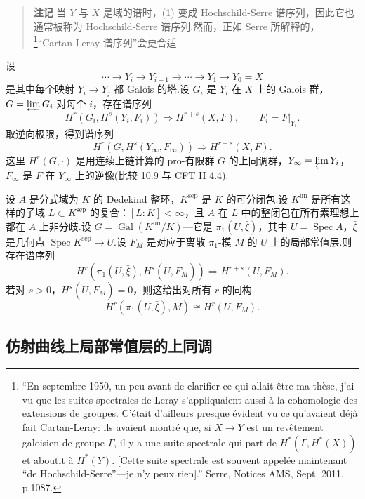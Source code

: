 \begin{quote}
\textbf{注记} 当 $Y$ 与 $X$ 是域的谱时，(1) 变成 Hochschild-Serre 谱序列，因此它也通常被称为 Hochschild-Serre 谱序列.然而，正如 Serre 所解释的，\footnote{``En septembre 1950, un peu avant de clarifier ce qui allait \^etre ma th\`ese, j'ai vu que les suites spectrales de Leray s'appliquaient aussi \`a la cohomologie des extensions de groupes. C'\'etait d'ailleurs presque \'evident vu ce qu'avaient d\'ej\`a fait Cartan-Leray: ils avaient montr\'e que, si $X \to Y$ est un rev\^etement galoisien de groupe $\Gamma$, il y a une suite spectrale qui part de $H^{*}(\Gamma, H^{*}(X))$ et aboutit \`a $H^{*}(Y)$. [Cette suite spectrale est souvent appel\'ee maintenant ``de Hochschild-Serre''---je n'y peux rien].'' Serre, Notices AMS, Sept. 2011, p.1087.}``Cartan-Leray 谱序列''会更合适.
\end{quote}

\begin{remark}\label{rem:14.10}
设
\[
\cdots \to Y_i \to Y_{i-1} \to \cdots \to Y_1 \to Y_0 = X
\]
是其中每个映射 $Y_i \to Y_j$ 都 Galois 的塔.设 $G_i$ 是 $Y_i$ 在 $X$ 上的 Galois 群，$G = \varprojlim G_i$.对每个 $i$，存在谱序列
\[
H^{r}(G_i, H^{s}(Y_i, F_i)) \Rightarrow H^{r+s}(X, F), \qquad F_i = F|_{Y_i}.
\]
取逆向极限，得到谱序列
\[
H^{r}(G, H^{s}(Y_\infty, F_\infty)) \Rightarrow H^{r+s}(X, F).
\]
这里 $H^{r}(G, \cdot)$ 是用连续上链计算的 pro-有限群 $G$ 的上同调群，$Y_\infty = \varprojlim Y_i$，$F_\infty$ 是 $F$ 在 $Y_\infty$ 上的逆像(比较 10.9 与 CFT II 4.4).
\end{remark}

\begin{example}\label{ex:14.11}
设 $A$ 是分式域为 $K$ 的 Dedekind 整环，$K^{\mathrm{sep}}$ 是 $K$ 的可分闭包.设 $K^{\mathrm{un}}$ 是所有这样的子域 $L \subset K^{\mathrm{sep}}$ 的复合：$[L \colon K] < \infty$，且 $A$ 在 $L$ 中的整闭包在所有素理想上都在 $A$ 上非分歧.设 $G = \operatorname{Gal}(K^{\mathrm{un}}/K)$---它是 $\pi_1(U, \bar{\xi})$，其中 $U = \operatorname{Spec} A$，$\bar{\xi}$ 是几何点 $\operatorname{Spec} K^{\mathrm{sep}} \to U$.设 $F_M$ 是对应于离散 $\pi_1$-模 $M$ 的 $U$ 上的局部常值层.则存在谱序列
\[
H^{r}(\pi_1(U, \bar{\xi}), H^{s}(\widetilde{U}, F_M)) \Rightarrow H^{r+s}(U, F_M).
\]
若对 $s > 0$，$H^{s}(\widetilde{U}, F_M) = 0$，则这给出对所有 $r$ 的同构
\[
H^{r}(\pi_1(U, \bar{\xi}), M) \cong H^{r}(U, F_M).
\]
\end{example}

\subsection*{仿射曲线上局部常值层的上同调}

